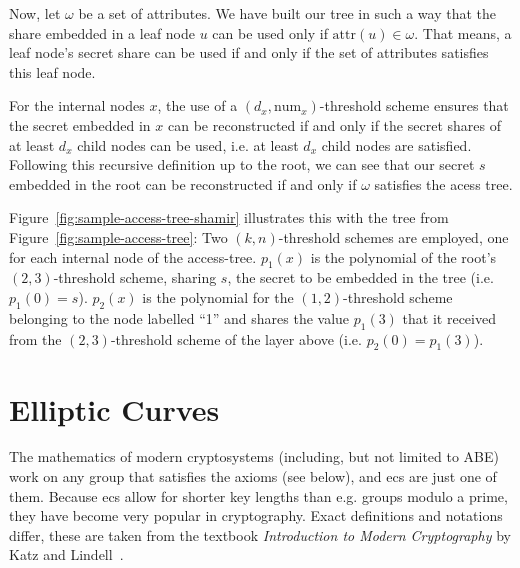 Now, let $\omega$ be a set of attributes.
We have built our tree in such a way that the share embedded in a leaf node $u$ can be used only if $\text{attr}(u) \in \omega$.
That means, a leaf node's secret share can be used if and only if the set of attributes satisfies this leaf node.

For the internal nodes $x$, the use of a $(d_x, \text{num}_x)$-threshold scheme ensures that the secret embedded in $x$ can be reconstructed if and only if the secret shares of at least $d_x$ child nodes can be used, i.e. at least $d_x$ child nodes are satisfied.
Following this recursive definition up to the root, we can see that our secret $s$ embedded in the root can be reconstructed if and only if $\omega$ satisfies the acess tree.

Figure~\ref{fig:sample-access-tree-shamir} illustrates this with the tree from Figure~\ref{fig:sample-access-tree}:
Two $(k,n)$-threshold schemes are employed, one for each internal node of the \gls{access-tree}.
$p_1(x)$ is the polynomial of the root's $(2,3)$-threshold scheme, sharing $s$, the secret to be embedded in the tree (i.e. $p_1(0) = s$).
$p_2(x)$ is the polynomial for the $(1,2)$-threshold scheme belonging to the node labelled ``1'' and shares the value $p_1(3)$ that it received from the $(2,3)$-threshold scheme of the layer above (i.e. $p_2(0) = p_1(3)$).

\section{Elliptic Curves}
\label{sec:ec}

The mathematics of modern cryptosystems (including, but not limited to ABE) work on any group that satisfies the axioms (see below), and \glspl{ec} are just one of them.
Because \glspl{ec} allow for shorter key lengths than e.g. groups modulo a prime, they have become very popular in cryptography.
Exact definitions and notations differ, these are taken from the textbook \emph{Introduction to Modern Cryptography} by Katz and Lindell~\cite{katz_introduction_2015}.

